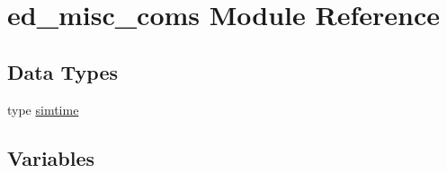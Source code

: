 \hypertarget{namespaceed__misc__coms}{}\section{ed\+\_\+misc\+\_\+coms Module Reference}
\label{namespaceed__misc__coms}
\subsection*{Data Types}
\begin{DoxyCompactItemize}
\item 
type \hyperlink{structed__misc__coms_1_1simtime}{simtime}
\end{DoxyCompactItemize}
\subsection*{Variables}
